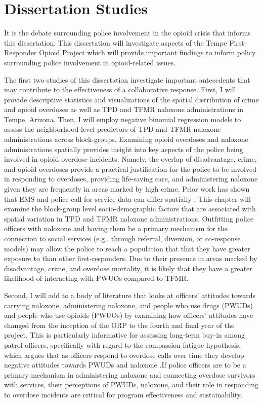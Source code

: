 \section{Dissertation Studies}
It is the debate surrounding police involvement in the opioid crisis that informs this dissertation. This dissertation will investigate aspects of the Tempe First-Responder Opioid Project which will provide important findings to inform policy surrounding police involvement in opioid-related issues.

The first two studies of this dissertation investigate important antecedents that may contribute to the effectiveness of a collaborative response. First, I will provide descriptive statistics and visualizations of the spatial distribution of crime and opioid overdoses as well as TPD and TFMR naloxone administrations in Tempe, Arizona. Then, I will employ negative binomial regression models to assess the neighborhood-level predictors of TPD and TFMR naloxone administrations across block-groups. Examining opioid overdoses and naloxone administrations spatially provides insight into key aspects of the police being involved in opioid overdose incidents. Namely, the overlap of disadvantage, crime, and opioid overdoses provide a practical justification for the police to be involved in responding to overdoses, providing life-saving care, and administering naloxone given they are frequently in areas marked by high crime. Prior work has shown that EMS and police call for service data can differ spatially \parencite{hibdon_concentration_2017, hibdon_going_2021}. This chapter will examine the block-group level socio-demographic factors that are associated with spatial variation in TPD and TFMR naloxone administrations. Outfitting police officers with naloxone and having them be a primary mechanism for the connection to social services (e.g., through referral, diversion, or co-response models) may allow the police to reach a population that that they have greater exposure to than other first-responders. Due to their presence in areas marked by disadvantage, crime, and overdose mortality, it is likely that they have a greater likelihood of interacting with PWUOs compared to TFMR. 

Second, I will add to a body of literature that looks at officers’ attitudes towards carrying naloxone, administering naloxone, and people who use drugs (PWUDs) and people who use opioids (PWUOs) by examining how officers’ attitudes have changed from the inception of the ORP to the fourth and final year of the project. This is particularly informative for assessing long-term buy-in among patrol officers, specifically with regard to the compassion fatigue hypothesis, which argues that as officers respond to overdose calls over time they develop negative attitudes towards PWUDs and naloxone \parencite{carroll_knowledge_2020, murphy_police_2020, murphy_police_2021}.If police officers are to be a primary mechanism in administering naloxone and connecting overdose survivors with services, their perceptions of PWUDs, naloxone, and their role in responding to overdose incidents are critical for program effectiveness and sustainability. 

